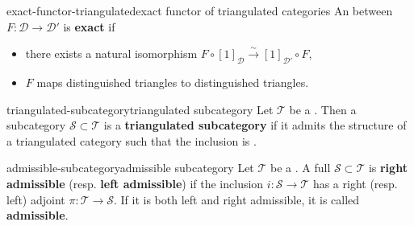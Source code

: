 \begin{topic}{exact-functor-triangulated}{exact functor of triangulated categories}
    An  between  $F : \mathcal{D} \to \mathcal{D}'$ is \textbf{exact} if
    \begin{itemize}
        \item there exists a natural isomorphism $F \circ [1]_\mathcal{D} \xrightarrow{\sim} [1]_{\mathcal{D}'} \circ F$,
        \item $F$ maps distinguished triangles to distinguished triangles.
    \end{itemize}
\end{topic}

\begin{topic}{triangulated-subcategory}{triangulated subcategory}
    Let $\mathcal{T}$ be a . Then a subcategory $\mathcal{S} \subset \mathcal{T}$ is a \textbf{triangulated subcategory} if it admits the structure of a triangulated category such that the inclusion is .
\end{topic}

\begin{topic}{admissible-subcategory}{admissible subcategory}
    Let $\mathcal{T}$ be a . A full  $\mathcal{S} \subset \mathcal{T}$ is \textbf{right admissible} (resp. \textbf{left admissible}) if the inclusion $i : \mathcal{S} \to \mathcal{T}$ has a right (resp. left) adjoint $\pi : \mathcal{T} \to \mathcal{S}$. If it is both left and right admissible, it is called \textbf{admissible}.
\end{topic}

